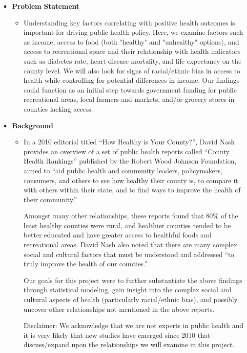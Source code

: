 \documentclass{article}
\begin{document}
\begin{itemize}[leftmargin=0pt]
\item[] \textbf{Problem Statement}
\begin{itemize}
    \item[] Understanding key factors correlating with positive health outcomes is important for driving public health policy. Here, we examine factors such as income, access to food (both "healthy" and "unhealthy" options), and access to recreational space and their relationship with health indicators such as diabetes rate, heart disease mortality, and life expectancy on the county level. We will also look for signs of racial/ethnic bias in access to health while controlling for potential differences in income. Our findings could function as an initial step towards government funding for public recreational areas, local farmers and markets, and/or grocery stores in counties lacking access.
\end{itemize}

\item[] \textbf{Background} 
\begin{itemize}
    \item[] In a 2010 editorial titled “How Healthy is Your County?”\cite{nash2010how}, David Nash provides an overview of a set of public health reports called “County Health Rankings”\cite{rwjf2010how} published by the Robert Wood Johnson Foundation, aimed to “aid public health and community leaders, policymakers, consumers, and others to see how healthy their county is, to compare it with others within their state, and to find ways to improve the health of their community.” 

    Amongst many other relationships, these reports found that 80\% of the least healthy counties were rural\cite{trapp2010health}, and healthier counties tended to be better educated and have greater access to healthful foods and recreational areas. David Nash also noted that there are many complex social and cultural factors that must be understood and addressed “to truly improve the health of our counties.”\cite{nash2010how}  

    Our goals for this project were to further substantiate the above findings through statistical modeling, gain insight into the complex social and cultural aspects of health (particularly racial/ethnic bias), and possibly uncover other relationships not mentioned in the above reports.  

    Disclaimer: We acknowledge that we are not experts in public health and it is very likely that new studies have emerged since 2010 that discuss/expand upon the relationships we will examine in this project.
\end{itemize}


\end{itemize}
\end{document}
